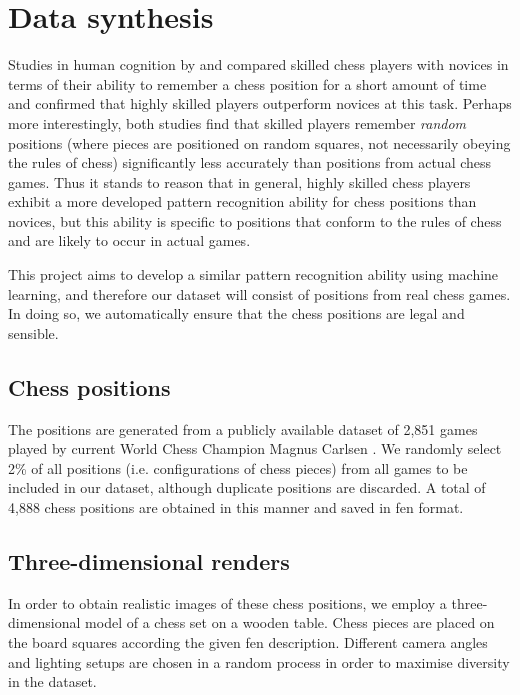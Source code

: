 \documentclass[../main.tex]{subfiles}
\begin{document}
\chapter{Data synthesis}
\label{chap:data_synthesis}

Studies in human cognition by \textcite{bilalic2010} and \textcite{zhou2018} compared skilled chess players with novices in terms of their ability to remember a chess position for a short amount of time and confirmed that highly skilled players outperform novices at this task.
Perhaps more interestingly, both studies find that skilled players remember \emph{random} positions (where pieces are positioned on random squares, not necessarily obeying the rules of chess) significantly less accurately than positions from actual chess games. 
Thus it stands to reason that in general, highly skilled chess players exhibit a more developed pattern recognition ability for chess positions than novices, but this ability is specific to positions that conform to the rules of chess and are likely to occur in actual games.

This project aims to develop a similar pattern recognition ability using machine learning, and therefore our dataset will consist of positions from real chess games. 
In doing so, we automatically ensure that the chess positions are legal and sensible.

\section{Chess positions}
\label{sec:data_chess_positions}
The positions are generated from a publicly available dataset of 2,851 games played by current World Chess Champion Magnus Carlsen \cite{64squares2020}.
We randomly select 2\% of all positions (i.e. configurations of chess pieces) from all games to be included in our dataset, although duplicate positions are discarded.
A total of 4,888 chess positions are obtained in this manner and saved in \gls{fen} format.

\section{Three-dimensional renders}
\label{sec:3d_renders}
In order to obtain realistic images of these chess positions, we employ a three-dimensional model of a chess set on a wooden table. 
Chess pieces are placed on the board squares according the given \gls{fen} description. 
Different camera angles and lighting setups are chosen in a random process in order to maximise diversity in the dataset.
\end{document}
